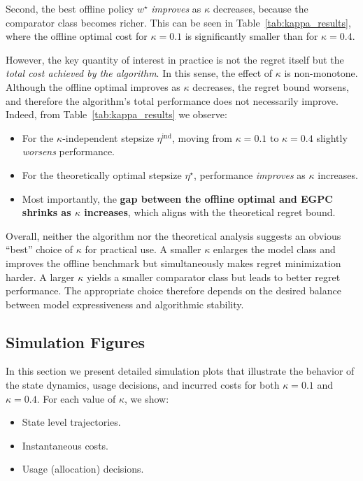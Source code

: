 \documentclass[11pt]{article}
\begin{document}
Second, the best offline policy $w^\star$ \emph{improves} as $\kappa$ decreases,
because the comparator class becomes richer. This can be seen in
Table~\ref{tab:kappa_results}, where the offline optimal cost for $\kappa = 0.1$ is
significantly smaller than for $\kappa = 0.4$.

However, the key quantity of interest in practice is not the regret itself but the
\emph{total cost achieved by the algorithm}. In this sense, the effect of $\kappa$ is
non-monotone. Although the offline optimal improves as $\kappa$ decreases, the regret
bound worsens, and therefore the algorithm's total performance does not necessarily
improve. Indeed, from Table~\ref{tab:kappa_results} we observe:

\begin{itemize}
    \item For the $\kappa$-independent stepsize $\eta^{\mathrm{ind}}$, moving from
    $\kappa = 0.1$ to $\kappa = 0.4$ slightly \emph{worsens} performance.
    \item For the theoretically optimal stepsize $\eta^\star$, performance
    \emph{improves} as $\kappa$ increases.
    \item Most importantly, the \textbf{gap between the offline optimal and EGPC
    shrinks as $\kappa$ increases}, which aligns with the theoretical regret bound.
\end{itemize}

Overall, neither the algorithm nor the theoretical analysis suggests an obvious
“best” choice of $\kappa$ for practical use. A smaller $\kappa$ enlarges the model
class and improves the offline benchmark but simultaneously makes regret minimization
harder. A larger $\kappa$ yields a smaller comparator class but leads to better regret
performance. The appropriate choice therefore depends on the desired balance between
model expressiveness and algorithmic stability.






\subsection{Simulation Figures}

In this section we present detailed simulation plots that illustrate the behavior of
the state dynamics, usage decisions, and incurred costs for both
$\kappa = 0.1$ and $\kappa = 0.4$.  
For each value of $\kappa$, we show:

\begin{itemize}
    \item State level trajectories.
    \item Instantaneous costs.
    \item Usage (allocation) decisions.
\end{itemize}
\end{document}
